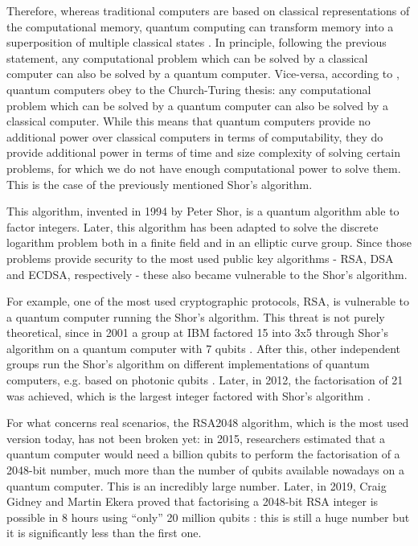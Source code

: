 \documentclass[a4paper,12pt]{article}
\def\eg{e.g.\xspace}
\begin{document}
Therefore, whereas traditional computers are based on classical representations of the computational memory, quantum computing can transform memory into a superposition of multiple classical states \cite{16_Quantum}.
In principle, following the previous statement, any computational problem which can be solved by a classical computer can also be solved by a quantum computer. Vice-versa, according to \cite{40_ChurchTuring}, quantum computers obey to the Church-Turing thesis: any computational problem which can be solved by a quantum computer can also be solved by a classical computer.
While this means that quantum computers provide no additional power over classical computers in terms of computability, they do provide additional power in terms of time and size complexity of solving certain problems, for which we do not have enough computational power to solve them.
This is the case of the previously mentioned Shor's algorithm.

This algorithm, invented in 1994 by Peter Shor, is a quantum algorithm able to factor integers. Later, this algorithm has been adapted to solve the discrete logarithm problem both in a finite field and in an elliptic curve group. Since those problems provide security to the most used public key algorithms - RSA, DSA and ECDSA, respectively - these also became vulnerable to the Shor's algorithm. 

For example, one of the most used cryptographic protocols, RSA, is vulnerable to a quantum computer running the Shor's algorithm.
This threat is not purely theoretical, since in 2001 a group at IBM factored 15 into 3x5 through Shor's algorithm on a quantum computer with 7 qubits \cite{41_ShorIbm}.
After this, other independent groups run the Shor's algorithm on different implementations of quantum computers, \eg based on photonic qubits \cite{42_Photonic}\cite{43_EntanglementQC}.
Later, in 2012, the factorisation of 21 was achieved, which is the largest integer factored with Shor's algorithm \cite{44_Factorization21}.

For what concerns real scenarios, the RSA2048 algorithm, which is the most used version today, has not been broken yet: in 2015, researchers estimated that a quantum computer would need a billion qubits to perform the factorisation of a 2048-bit number, much more than the number of qubits available nowadays on a quantum computer. This is an incredibly large number. Later, in 2019, Craig Gidney and Martin Ekera proved that factorising a 2048-bit RSA integer is possible in 8 hours using ``only'' 20 million qubits \cite{54_rsa2048}: this is still a huge number but it is significantly less than the first one. 
\end{document}
